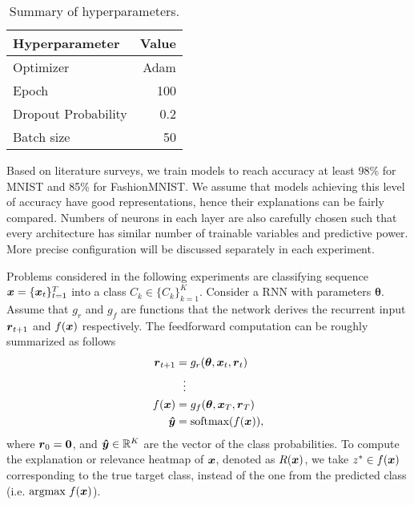 \begin{table}[!htb]
\centering
\begin{tabular}{l|r}
\textbf{Hyperparameter} & \multicolumn{1}{l}{\textbf{Value}} \\ \hline
Optimizer               & Adam                               \\
Epoch     & 100                                \\
Dropout Probability     & 0.2                               \\
Batch size              & 50                                
\end{tabular}
\caption{Summary of hyperparameters.}
\label{tab:hyper_summary}
\end{table}



  Based on literature surveys, we train models to reach accuracy at least  98\% for MNIST and 85\% for FashionMNIST.  We assume that models achieving this level of accuracy have good representations, hence their explanations can be fairly compared. Numbers of neurons in each layer are also carefully chosen such that every architecture has similar number of trainable variables and predictive power.  More precise configuration will be discussed separately in each experiment. 

Problems considered in the following experiments are classifying sequence $\boldsymbol{x}= \{ \boldsymbol{x}_t \}_{t=1}^T$ into a class $C_k \in \{ C_k \}_{k=1}^K$. Consider a RNN with parameters $\boldsymbol{\theta}$. Assume that $g_r$ and $g_{f}$ are functions that the network derives the recurrent input $\patvector{r}_{t+1}$ and $f(\boldsymbol{x})$ respectively. The feedforward computation can be roughly summarized as follows
 \begin{align}
 	\patvector{r}_{t+1} &= g_r(\patvector{\theta}, \patvector{x}_t, \patvector{r}_t) \\
 	 &\ \ \vdots\\
f(\x) &= g_{f}(\patvector{\theta}, \patvector{x}_{T},  \patvector{r}_{T}) \\
 	\patvector{\hat{y}} &= \text{softmax}(f(\x)),
 \end{align}
 where $\patvector{r}_0 = \patvector{0}$, and $\patvector{\hat{y}} \in \mathbb{R}^K$ are the vector of the class probabilities. To compute the explanation or relevance heatmap of $\boldsymbol{x}$, denoted as $R(\boldsymbol{x})$, we take $z^* \in f(\boldsymbol{x})$ corresponding to the true target class, instead of the one from the predicted class (i.e. $\underset{}{\text{argmax}}\  f(\boldsymbol{x})$).  
 
